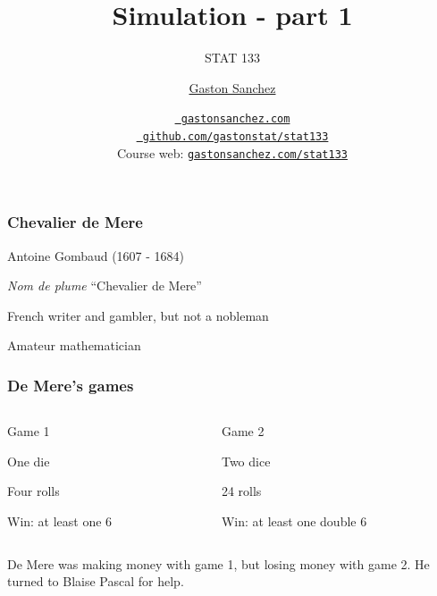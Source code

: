 \documentclass[12pt]{beamer}\usepackage[]{graphicx}\usepackage[]{color}
\title{Simulation - part 1}
\subtitle{STAT 133}
\author{\href{http://www.gastonsanchez.com}{Gaston Sanchez}}
\institute{Department of Statistics, UC{\textendash}Berkeley}
\date{\href{http://www.gastonsanchez.com}{\tt \scriptsize \color{foreground} gastonsanchez.com}
\\[-4pt]
\href{http://github.com/gastonstat/stat133}{\tt \scriptsize \color{foreground} github.com/gastonstat/stat133}
\\[-4pt]
{\scriptsize Course web: \href{http://www.gastonsanchez.com/stat133}{\tt gastonsanchez.com/stat133}}
}
\begin{document}
{
  \frame{
    \titlepage
  } 
}


\begin{frame}
\begin{center}
\Huge{}
\end{center}
\end{frame}


\begin{frame}
\begin{center}
\Huge{}
\end{center}
\end{frame}


\begin{frame}
\frametitle{Chevalier de Mere}

\bbi
  \item Antoine Gombaud (1607 - 1684)
  \item \textit{Nom de plume} ``Chevalier de Mere''
  \item French writer and gambler, but not a nobleman
  \item Amateur mathematician
\ei

\end{frame}


\begin{frame}[fragile]
\frametitle{}
\begin{center}
\end{center}
\end{frame}


\begin{frame}[fragile]
\frametitle{De Mere's games}

\begin{columns}[t]
\begin{column}{0.4\textwidth}
Game 1
\bi
  \item One die
  \item Four rolls
  \item Win: at least one 6
\ei
\end{column}

\pause

\begin{column}{0.55\textwidth}
Game 2
\bi
  \item Two dice
  \item 24 rolls
  \item Win: at least one double 6
\ei
\end{column}
\end{columns}

\bigskip
\bigskip
\pause
De Mere was making money with game 1, but losing money with game 2. He turned to Blaise Pascal for help.
\end{frame}
\end{document}
